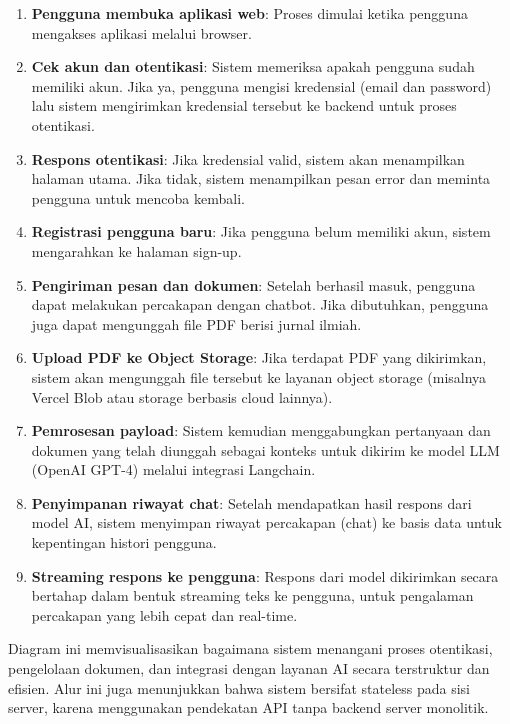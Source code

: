 \begin{enumerate}
  \item \textbf{Pengguna membuka aplikasi web}: Proses dimulai ketika pengguna mengakses aplikasi melalui browser.
  
  \item \textbf{Cek akun dan otentikasi}: Sistem memeriksa apakah pengguna sudah memiliki akun. Jika ya, pengguna mengisi kredensial (email dan password) lalu sistem mengirimkan kredensial tersebut ke backend untuk proses otentikasi.
  
  \item \textbf{Respons otentikasi}: Jika kredensial valid, sistem akan menampilkan halaman utama. Jika tidak, sistem menampilkan pesan error dan meminta pengguna untuk mencoba kembali.
  
  \item \textbf{Registrasi pengguna baru}: Jika pengguna belum memiliki akun, sistem mengarahkan ke halaman sign-up.
  
  \item \textbf{Pengiriman pesan dan dokumen}: Setelah berhasil masuk, pengguna dapat melakukan percakapan dengan chatbot. Jika dibutuhkan, pengguna juga dapat mengunggah file PDF berisi jurnal ilmiah.
  
  \item \textbf{Upload PDF ke Object Storage}: Jika terdapat PDF yang dikirimkan, sistem akan mengunggah file tersebut ke layanan object storage (misalnya Vercel Blob atau storage berbasis cloud lainnya).
  
  \item \textbf{Pemrosesan payload}: Sistem kemudian menggabungkan pertanyaan dan dokumen yang telah diunggah sebagai konteks untuk dikirim ke model LLM (OpenAI GPT-4) melalui integrasi Langchain.
  
  \item \textbf{Penyimpanan riwayat chat}: Setelah mendapatkan hasil respons dari model AI, sistem menyimpan riwayat percakapan (chat) ke basis data untuk kepentingan histori pengguna.
  
  \item \textbf{Streaming respons ke pengguna}: Respons dari model dikirimkan secara bertahap dalam bentuk streaming teks ke pengguna, untuk pengalaman percakapan yang lebih cepat dan real-time.
\end{enumerate}

Diagram ini memvisualisasikan bagaimana sistem menangani proses otentikasi, pengelolaan dokumen, dan integrasi dengan layanan AI secara terstruktur dan efisien. Alur ini juga menunjukkan bahwa sistem bersifat stateless pada sisi server, karena menggunakan pendekatan API tanpa backend server monolitik.

